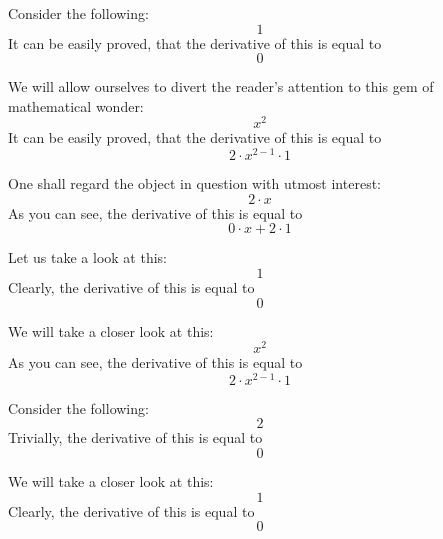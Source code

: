 \documentclass{article}
\begin{document}
Consider the following:
\begin{equation}
1 
\end{equation}
It can be easily proved, that the derivative of this is equal to
\begin{equation}
0 
\end{equation}

We will allow ourselves to divert the reader's attention to this gem of mathematical wonder:
\begin{equation}
x ^{2 } 
\end{equation}
It can be easily proved, that the derivative of this is equal to
\begin{equation}
2 \cdot x ^{2 - 1 } \cdot 1 
\end{equation}

One shall regard the object in question with utmost interest:
\begin{equation}
2 \cdot x 
\end{equation}
As you can see, the derivative of this is equal to
\begin{equation}
0 \cdot x + 2 \cdot 1 
\end{equation}

Let us take a look at this:
\begin{equation}
1 
\end{equation}
Clearly, the derivative of this is equal to
\begin{equation}
0 
\end{equation}

We will take a closer look at this:
\begin{equation}
x ^{2 } 
\end{equation}
As you can see, the derivative of this is equal to
\begin{equation}
2 \cdot x ^{2 - 1 } \cdot 1 
\end{equation}

Consider the following:
\begin{equation}
2 
\end{equation}
Trivially, the derivative of this is equal to
\begin{equation}
0 
\end{equation}

We will take a closer look at this:
\begin{equation}
1 
\end{equation}
Clearly, the derivative of this is equal to
\begin{equation}
0 
\end{equation}
\end{document}
